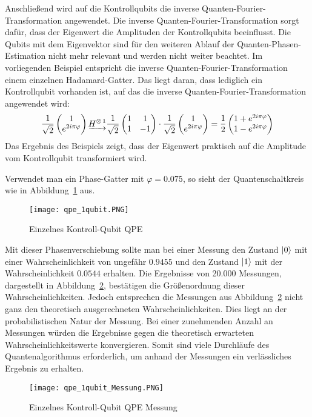 Anschließend wird auf die Kontrollqubits die inverse Quanten-Fourier-Transformation angewendet.
Die inverse Quanten-Fourier-Transformation sorgt dafür, 
dass der Eigenwert die Amplituden der Kontrollqubits beeinflusst.
Die Qubits mit dem Eigenvektor sind für den weiteren Ablauf der Quanten-Phasen-Estimation nicht mehr relevant 
und werden nicht weiter beachtet.
Im vorliegenden Beispiel entspricht die inverse Quanten-Fourier-Transformation einem einzelnen Hadamard-Gatter. 
Das liegt daran, dass lediglich ein Kontrollqubit vorhanden ist, 
auf das die inverse Quanten-Fourier-Transformation angewendet wird:
\[
\frac{1}{\sqrt{2}}
\begin{pmatrix}
  1 \\
  e^{2 i \pi \varphi}
 \end{pmatrix}
 \underrightarrow{H^{\operatorname{\otimes}1}}
 \frac{1}{\sqrt{2}}
 \begin{pmatrix}
  1 & 1\\
  1 & -1
 \end{pmatrix}
 \cdot
 \frac{1}{\sqrt{2}}
\begin{pmatrix}
  1 \\
  e^{2 i \pi \varphi}
 \end{pmatrix}
 =
 \frac{1}{2}
 \begin{pmatrix}
  1 + e^{2 i \pi \varphi}\\
  1 - e^{2 i \pi \varphi}
 \end{pmatrix}
\]
Das Ergebnis des Beispiels zeigt, dass der Eigenwert praktisch auf die Amplitude vom Kontrollqubit transformiert wird.

Verwendet man ein Phase-Gatter mit \(\varphi  = 0.075\), 
so sieht der Quantenschaltkreis wie in Abbildung~\ref{fig:qpe_1qubit} aus.
\begin{figure}[H]
  \centering
  \texttt{[image: qpe\_1qubit.PNG]}
  \caption{Einzelnes Kontroll-Qubit QPE}
  \label{fig:qpe_1qubit}
\end{figure}
Mit dieser Phasenverschiebung sollte man bei einer Messung den Zustand \(\ket{0}\)
mit einer Wahrscheinlichkeit von ungefähr \(0.9455\) 
und den Zustand \(\ket{1}\) mit der Wahrscheinlichkeit \(0.0544\) erhalten.
Die Ergebnisse von 20.000 Messungen, dargestellt in Abbildung~\ref{fig:qpe_1qubit_Messung}, 
bestätigen die Größenordnung dieser Wahrscheinlichkeiten.
Jedoch entsprechen die Messungen aus Abbildung~\ref{fig:qpe_1qubit_Messung} nicht ganz den theoretisch ausgerechneten Wahrscheinlichkeiten.
Dies liegt an der probabilistischen Natur der Messung.
Bei einer zunehmenden Anzahl an Messungen würden die Ergebnisse gegen die theoretisch erwarteten Wahrscheinlichkeitswerte konvergieren.
Somit sind viele Durchläufe des Quantenalgorithmus erforderlich, 
um anhand der Messungen ein verlässliches Ergebnis zu erhalten.
\begin{figure}[H]
  \caption{Einzelnes Kontroll-Qubit QPE Messung}
  \label{fig:qpe_1qubit_Messung}
  \texttt{[image: qpe\_1qubit\_Messung.PNG]}
  \centering
  \end{figure}
  


